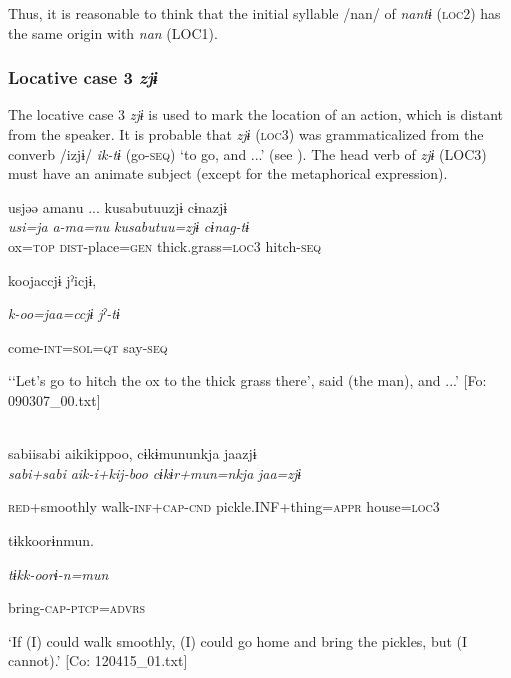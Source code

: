 Thus, it is reasonable to think that the initial syllable /nan/ of \textit{nantɨ} (\textsc{loc}2) has the same origin with \textit{nan} (LOC1).

\subsubsection{Locative case 3 \textit{zjɨ}}

The locative case 3 \textit{zjɨ} is used to mark the location of an action, which is distant from the speaker. It is probable that \textit{zjɨ} (\textsc{loc}3) was grammaticalized from the converb /izjɨ/ \textit{ik-tɨ} (go-\textsc{seq}) ‘to go, and ...’ (see ). The head verb of \textit{zjɨ} (LOC3) must have an animate subject (except for the metaphorical expression).

\ea\label{ex:6-67}
\ea {\TM}  usjəə  amanu ...  kusabutuuzjɨ  cɨnazjɨ\\
\gll \textit{usi=ja}  \textit{a-ma=nu}  \textit{kusabutuu=zjɨ}  \textit{cɨnag-tɨ}\\

      ox=\textsc{top}  \textsc{dist}-place=\textsc{gen}  thick.grass=\textsc{loc}3  hitch-\textsc{seq}

      koojaccjɨ  jˀicjɨ,

      \textit{k-oo=jaa=ccjɨ}  \textit{jˀ-tɨ}

      come-\textsc{int}=\textsc{sol}=\textsc{qt}  say-\textsc{seq}

\glt ‘‘Let’s go to hitch the ox to the thick grass there’, said (the man), and ...’ [Fo: 090307\_00.txt]
\z

 \ex\relax[= (4-54 b)]\\
{\TM}
\gll  sabiisabi  aikikippoo,  cɨkɨmununkja  jaazjɨ\\

      \textit{sabi+sabi}  \textit{aik-i+kij-boo}  \textit{cɨkɨr+mun=nkja}  \textit{jaa=zjɨ}

      \textsc{red}+smoothly  walk-\textsc{inf}+\textsc{cap}-\textsc{cnd}  pickle.INF+thing=\textsc{appr}  house=\textsc{loc}3

      tɨkkoorɨnmun.

      \textit{tɨkk-oorɨ-n=mun}

      bring-\textsc{cap}-\textsc{ptcp}=\textsc{advrs}

\glt ‘If (I) could walk smoothly, (I) could go home and bring the pickles, but (I cannot).’ [Co: 120415\_01.txt]
\z

